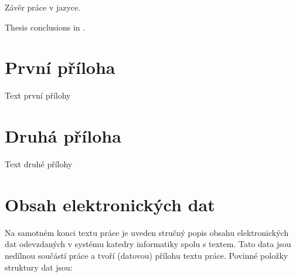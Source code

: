 \documentclass[
  master,
  program=ainfvs,
  biblatex,
  figures=false,
  glossaries,
  index
]{kidiplom}
\begin{document}
\begin{kiconclusions}
Závěr práce v  jazyce.
\end{kiconclusions}

\begin{kiconclusions}[english]
Thesis conclusions in .
\end{kiconclusions}

\appendix

\section{První příloha}
Text první přílohy

\section{Druhá příloha}
Text druhé přílohy

\section{Obsah elektronických dat} \label{sec:ObsahData}

Na samotném konci textu práce je uveden stručný popis obsahu
elektronických dat odevzdaných v systému katedry informatiky spolu s
textem. Tato data jsou nedílnou součástí práce a tvoří (datovou)
přílohu textu práce. Povinné položky struktury dat jsou:
\end{document}
